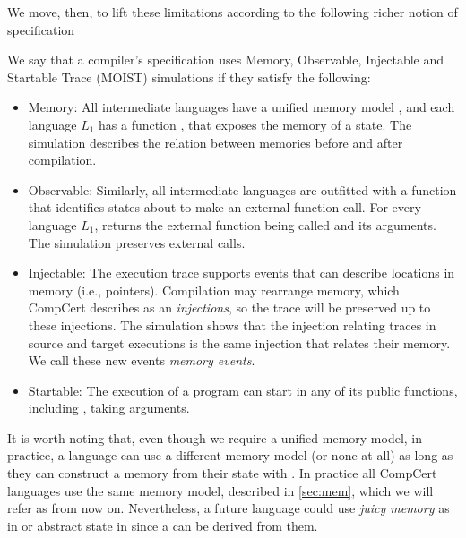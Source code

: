 We move, then, to lift these limitations according to the following richer notion of specification  
\begin{definition}
We say that a compiler's specification uses Memory, Observable, Injectable and Startable Trace (MOIST) simulations if they satisfy the following:
\begin{itemize}
\item Memory: All intermediate languages have a unified memory model , and each language $L_1$ has a function , that exposes the memory of a state. The simulation describes the relation between memories before and after compilation.  
\item Observable: Similarly, all intermediate languages are outfitted with a function  that identifies states about to make an external function call. For every language $L_1$,  returns the external function being called and its arguments. The simulation preserves external calls. 
\item Injectable: The execution trace supports events that can describe locations in memory (i.e., pointers). Compilation may rearrange memory, which CompCert describes as an \emph{injections}, so the trace will be preserved up to these injections. The simulation shows that the injection relating traces in source and target executions is the same injection that relates their memory. We call these new events \emph{memory events}.
\item Startable: The execution of a program can start in any of its public functions, including , taking arguments.  

\end{itemize}
\end{definition}
It is worth noting that, even though we require a unified memory model, in practice, a language can use a different memory model (or none at all) as long as they can construct a memory from their state with . In practice all CompCert languages use the same memory model, described in \ref{sec:mem}, which we will refer as  from now on.
Nevertheless, a future language could use \emph{juicy memory} as in \cite{appel14:plcc} or abstract state in \cite{Ronghui15abstractionlayers} since a  can be derived from them. 

